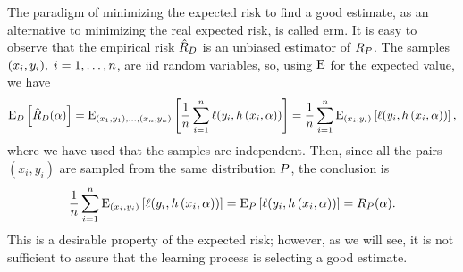 %
The paradigm of minimizing the expected risk to find a good estimate, as an alternative to minimizing the real expected risk, is called \acrfull{erm}.
%
It is easy to observe that the empirical risk $\hat{R}_{D}$ is an unbiased estimator of $R_P$. The samples $(x_i, y_i), \; i=1, \ldots, n$, are \acrfull{iid} random variables, so, using $\operatorname{E}$ for the expected value, we have 
\begin{equation}
    \nonumber
     \operatorname{E}_D \left[ \hat{R}_{D}(\alpha) \right] = \operatorname{E}_{(x_1, y_1), \ldots, (x_n, y_n)} \left[\frac{1}{n} \sum_{i=1}^n \ell(y_i, h\left(x_i, \alpha\right))\right] = \frac{1}{n} \sum_{i=1}^n \operatorname{E}_{(x_i, y_i)} \left[\ell(y_i, h\left(x_i, \alpha\right))\right],
\end{equation}
where we have used that the samples are independent.
Then, since all the pairs $(x_i, y_i)$ are sampled from the same distribution $P$, the conclusion is 
\begin{equation}
    \nonumber
    \frac{1}{n} \sum_{i=1}^n \operatorname{E}_{(x_i, y_i)} \left[ \ell(y_i, h\left(x_i, \alpha\right)) \right] = \operatorname{E}_{P} \left[\ell(y_i, h\left(x_i, \alpha\right)) \right] = R_P(\alpha) .
\end{equation}
This is a desirable property of the expected risk; however, as we will see, it is not sufficient to assure that the learning process is selecting a good estimate.

